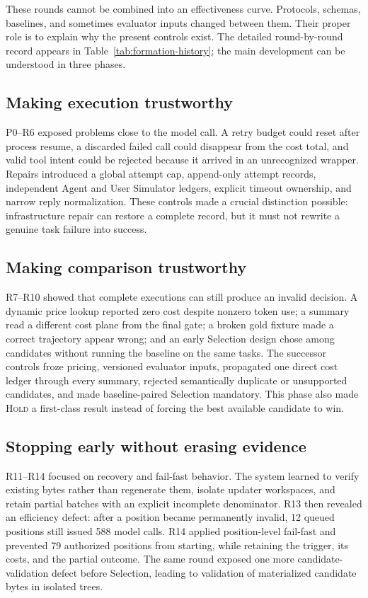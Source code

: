 \documentclass[10pt,twocolumn]{article}
\newcommand{\hold}{\textsc{Hold}\xspace}
\begin{document}
These rounds cannot be combined into an effectiveness curve. Protocols,
schemas, baselines, and sometimes evaluator inputs changed between them. Their
proper role is to explain why the present controls exist. The detailed
round-by-round record appears in Table~\ref{tab:formation-history}; the main
development can be understood in three phases.

\subsection{Making execution trustworthy}

P0--R6 exposed problems close to the model call. A retry budget could reset
after process resume, a discarded failed call could disappear from the cost
total, and valid tool intent could be rejected because it arrived in an
unrecognized wrapper. Repairs introduced a global attempt cap, append-only
attempt records, independent Agent and User Simulator ledgers, explicit timeout
ownership, and narrow reply normalization. These controls made a crucial
distinction possible: infrastructure repair can restore a complete record, but
it must not rewrite a genuine task failure into success.

\subsection{Making comparison trustworthy}

R7--R10 showed that complete executions can still produce an invalid decision.
A dynamic price lookup reported zero cost despite nonzero token use; a summary
read a different cost plane from the final gate; a broken gold fixture made a
correct trajectory appear wrong; and an early Selection design chose among
candidates without running the baseline on the same tasks. The successor
controls froze pricing, versioned evaluator inputs, propagated one direct cost
ledger through every summary, rejected semantically duplicate or unsupported
candidates, and made baseline-paired Selection mandatory. This phase also made
\hold a first-class result instead of forcing the best available candidate to
win.

\subsection{Stopping early without erasing evidence}

R11--R14 focused on recovery and fail-fast behavior. The system learned to
verify existing bytes rather than regenerate them, isolate updater workspaces,
and retain partial batches with an explicit incomplete denominator. R13 then
revealed an efficiency defect: after a position became permanently invalid, 12
queued positions still issued 588 model calls. R14 applied position-level
fail-fast and prevented 79 authorized positions from starting, while retaining
the trigger, its costs, and the partial outcome. The same round exposed one
more candidate-validation defect before Selection, leading to validation of
materialized candidate bytes in isolated trees.
\end{document}
